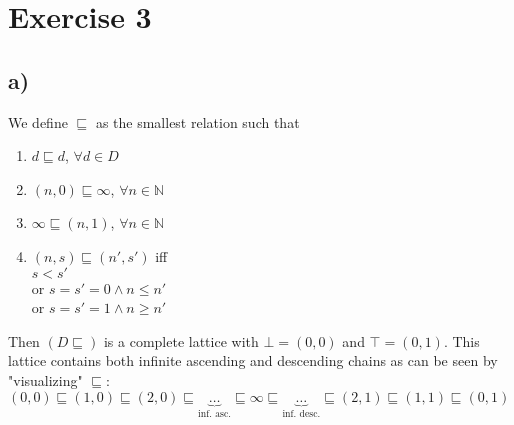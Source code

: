 \documentclass[fleqn,12pt]{article}
\begin{document}
\section*{Exercise 3}
\subsection*{a)}
We define $\sqsubseteq$ as the smallest relation such that\\
\begin{enumerate}
\item $d \sqsubseteq d$, $\forall d \in D$
\item $(n,0) \sqsubseteq \infty$, $\forall n \in \mathbb{N}$
\item $\infty \sqsubseteq (n,1)$, $\forall n \in \mathbb{N}$
\item $(n,s) \sqsubseteq (n',s')$ iff \\ 
	$s < s'$\\
	or $s=s'=0 \wedge n \leq n'$\\
	or $s=s'=1 \wedge n \geq n'$	
\end{enumerate}
Then $(D\sqsubseteq)$ is a complete lattice with $\bot=(0,0)$ and $\top=(0,1)$.
This lattice contains both infinite ascending and descending chains as can be seen by "visualizing" $\sqsubseteq$:\\
$(0,0)\sqsubseteq(1,0)\sqsubseteq(2,0)\sqsubseteq \underbrace{\dots}_\text{inf. asc.} \sqsubseteq\infty\sqsubseteq \underbrace{\dots}_\text{inf. desc.} \sqsubseteq (2,1) \sqsubseteq (1,1) \sqsubseteq (0,1)$
\newpage
\end{document}
